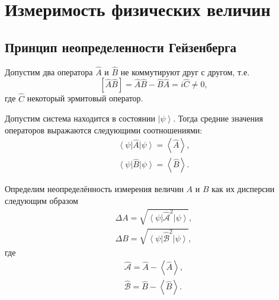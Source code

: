 \section{Измеримость физических величин}
\subsection{Принцип неопределенности Гейзенберга}
\label{AddHeisenbergUncertaintyPrinciple}
Допустим два оператора $\hat{A}$ и $\hat{B}$ не коммутируют друг с
другом, т.е. 
\begin{equation}
\left[
\hat{A}\hat{B}
\right] = 
\hat{A}\hat{B} - \hat{B}\hat{A} = i \hat{C} \ne 0,
\nonumber
\end{equation}
где $\hat{C}$ некоторый эрмитовый оператор.

Допустим система находится в состоянии $\left|\psi\right>$. Тогда
средние значения операторов выражаются следующими соотношениями:
\begin{eqnarray}
\left<\psi\right|\hat{A}\left|\psi\right> = \left<\hat{A}\right>,
\nonumber \\
\left<\psi\right|\hat{B}\left|\psi\right> = \left<\hat{B}\right>.
\nonumber
\end{eqnarray}

Определим неопределённость измерения величин $A$ и $B$ как их
дисперсии следующим образом
\begin{eqnarray}
\Delta A = \sqrt{\left<\psi\right|
\hat{\mathcal{A}}^2\left|\psi\right>}, 
\nonumber \\
\Delta B = \sqrt{\left<\psi\right|
\hat{\mathcal{B}}^2\left|\psi\right>}, 
\nonumber
\end{eqnarray}
где
\begin{eqnarray}
\hat{\mathcal{A}} = \hat{A}-\left<\hat{A}\right>, 
\nonumber \\
\hat{\mathcal{B}} = \hat{B}-\left<\hat{B}\right>.
\nonumber
\end{eqnarray}


